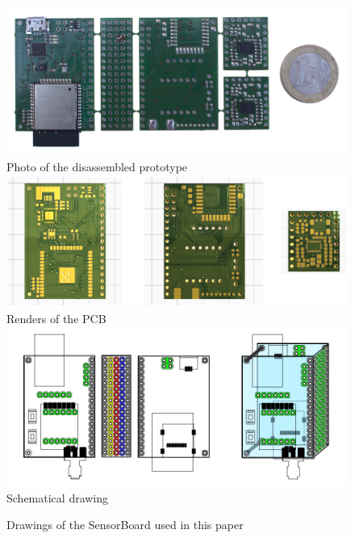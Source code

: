 \begin{figure}
	\centering
	\label{fig:SensorBoardDrawings}
	\caption{Drawings of the SensorBoard used in this paper}
	\includegraphics[width=\linewidth]{img/PCBphoto.jpg}
	\\Photo of the disassembled prototype\\
	\vspace{0.4cm}
	\includegraphics[width=\linewidth]{img/renders.png}
	\vspace{0.4cm}
	\\Renders of the \ac{PCB}\\
	\vspace{0.4cm}
	\includegraphics[scale=1]{img/SensorBoardDrawing.pdf}
	\\Schematical drawing
\end{figure}